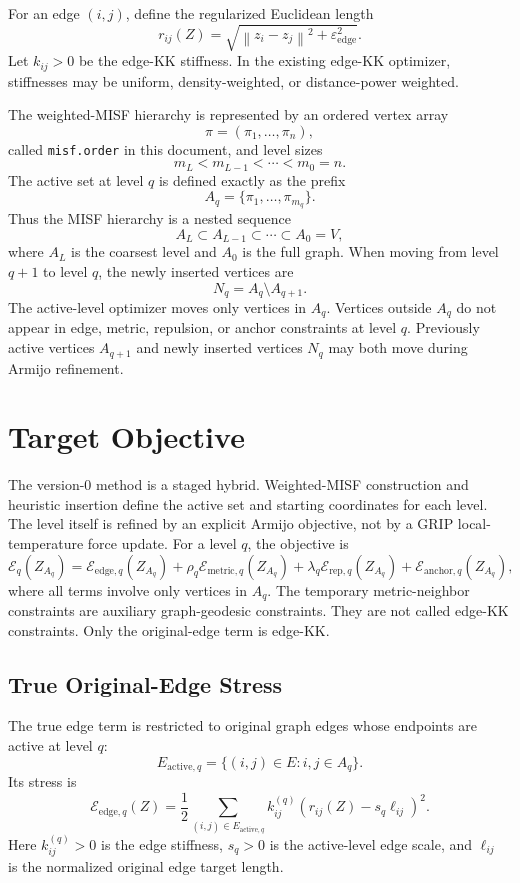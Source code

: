 \documentclass[11pt]{article}
\newcommand{\norm}[1]{\left\lVert #1 \right\rVert}
\newcommand{\eps}{\varepsilon}
\begin{document}
For an edge \((i,j)\), define the regularized Euclidean length
\[
  r_{ij}(Z) = \sqrt{\norm{z_i-z_j}^2 + \eps_{\mathrm{edge}}^2}.
\]
Let \(k_{ij} > 0\) be the edge-KK stiffness. In the existing edge-KK optimizer,
stiffnesses may be uniform, density-weighted, or distance-power weighted.

The weighted-MISF hierarchy is represented by an ordered vertex array
\[
  \pi = (\pi_1,\ldots,\pi_n),
\]
called \texttt{misf.order} in this document, and level sizes
\[
  m_L < m_{L-1} < \cdots < m_0=n.
\]
The active set at level \(q\) is defined exactly as the prefix
\[
  A_q = \{\pi_1,\ldots,\pi_{m_q}\}.
\]
Thus the MISF hierarchy is a nested sequence
\[
  A_L \subset A_{L-1} \subset \cdots \subset A_0 = V,
\]
where \(A_L\) is the coarsest level and \(A_0\) is the full graph. When moving
from level \(q+1\) to level \(q\), the newly inserted vertices are
\[
  N_q = A_q \setminus A_{q+1}.
\]
The active-level optimizer moves only vertices in \(A_q\). Vertices outside
\(A_q\) do not appear in edge, metric, repulsion, or anchor constraints at level
\(q\). Previously active vertices \(A_{q+1}\) and newly inserted vertices
\(N_q\) may both move during Armijo refinement.

\section{Target Objective}

The version-0 method is a staged hybrid. Weighted-MISF construction and
heuristic insertion define the active set and starting coordinates for each
level. The level itself is refined by an explicit Armijo objective, not by a
GRIP local-temperature force update. For a level \(q\), the objective is
\[
  \mathcal{E}_q(Z_{A_q})
  =
  \mathcal{E}_{\mathrm{edge},q}(Z_{A_q})
  +
  \rho_q \mathcal{E}_{\mathrm{metric},q}(Z_{A_q})
  +
  \lambda_q \mathcal{E}_{\mathrm{rep},q}(Z_{A_q})
  +
  \mathcal{E}_{\mathrm{anchor},q}(Z_{A_q}),
\]
where all terms involve only vertices in \(A_q\). The temporary metric-neighbor
constraints are auxiliary graph-geodesic constraints. They are not called
edge-KK constraints. Only the original-edge term is edge-KK.

\subsection{True Original-Edge Stress}

The true edge term is restricted to original graph edges whose endpoints are
active at level \(q\):
\[
  E_{\mathrm{active},q}
  =
  \{(i,j)\in E : i,j\in A_q\}.
\]
Its stress is
\[
  \mathcal{E}_{\mathrm{edge},q}(Z)
  =
  \frac{1}{2}
  \sum_{(i,j)\in E_{\mathrm{active},q}}
  k_{ij}^{(q)}
  \left(
    r_{ij}(Z) - s_q \ell_{ij}
  \right)^2.
\]
Here \(k_{ij}^{(q)}>0\) is the edge stiffness, \(s_q>0\) is the active-level
edge scale, and \(\ell_{ij}\) is the normalized original edge target length.
\end{document}
